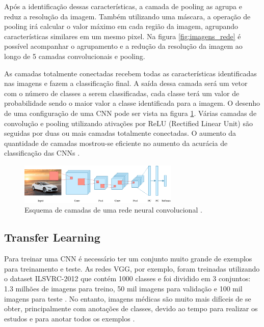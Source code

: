 \documentclass[conference]{IEEEtran}
\begin{document}
Após a identificação dessas características, a camada de pooling as agrupa e reduz a resolução da imagem. Também utilizando uma máscara, a operação de pooling irá calcular o valor máximo em cada região da imagem, agrupando características similares em um mesmo pixel. Na figura \ref{fig:imagens_rede} é possível acompanhar o agrupamento e a redução da resolução da imagem ao longo de 5 camadas convolucionais e pooling.

As camadas totalmente conectadas recebem todas as características identificadas nas imagens e fazem a classificação final. A saída dessa camada será um vetor com o número de classes a serem classificadas, cada classe terá um valor de probabilidade sendo o maior valor a classe identificada para a imagem. O desenho de uma configuração de uma CNN pode ser vista na figura \ref{fig:convolucao}. Várias camadas de convolução e pooling utilizando ativações por ReLU (Rectified Linear Unit) são seguidas por duas ou mais camadas totalmente conectadas. O aumento da quantidade de camadas mostrou-se eficiente no aumento da acurácia de classificação das CNNs \cite{simonyan2014}.


\begin{figure}[!t]
 \centering
 \includegraphics[width=3in]{img/convolucao.png}
 \caption{Esquema de camadas de uma rede neural convolucional \cite{convTDS}.}
 \label{fig:convolucao}
\end{figure}


  \subsection{Transfer Learning}


  Para treinar uma CNN é necessário ter um conjunto muito grande de exemplos para treinamento e teste. As redes VGG, por exemplo, foram treinadas utilizando o dataset ILSVRC-2012 \cite{ILSVRC15} que contém 1000 classes e foi dividido em 3 conjuntos: 1.3 milhões de imagens para treino, 50 mil imagens para validação e 100 mil imagens para teste \cite{simonyan2014}. No entanto, imagens médicas são muito mais difíceis de se obter, principalmente com anotações de classes, devido ao tempo para realizar os estudos e para anotar todos os exemplos \cite{greenspan2016}.
  
\end{document}
